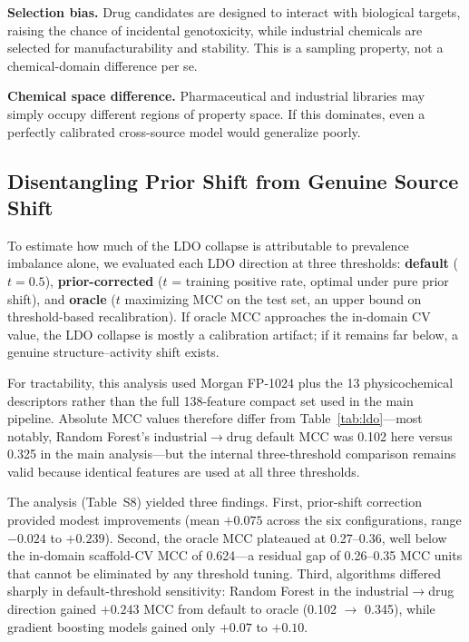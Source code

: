 \textbf{Selection bias.} Drug candidates are designed to interact with biological targets, raising the chance of incidental genotoxicity, while industrial chemicals are selected for manufacturability and stability. This is a sampling property, not a chemical-domain difference per se.

\textbf{Chemical space difference.} Pharmaceutical and industrial libraries may simply occupy different regions of property space.\cite{Lipinski_2004,Veber_2002} If this dominates, even a perfectly calibrated cross-source model would generalize poorly.

\subsection{Disentangling Prior Shift from Genuine Source Shift}

To estimate how much of the LDO collapse is attributable to prevalence imbalance alone, we evaluated each LDO direction at three thresholds: \textbf{default} ($t = 0.5$), \textbf{prior-corrected} ($t$ = training positive rate, optimal under pure prior shift), and \textbf{oracle} ($t$ maximizing MCC on the test set, an upper bound on threshold-based recalibration). If oracle MCC approaches the in-domain CV value, the LDO collapse is mostly a calibration artifact; if it remains far below, a genuine structure--activity shift exists.

For tractability, this analysis used Morgan FP-1024 plus the 13 physicochemical descriptors rather than the full 138-feature compact set used in the main pipeline. Absolute MCC values therefore differ from Table~\ref{tab:ldo}---most notably, Random Forest's industrial$\to$drug default MCC was 0.102 here versus 0.325 in the main analysis---but the internal three-threshold comparison remains valid because identical features are used at all three thresholds.

The analysis (Table~S8) yielded three findings. First, prior-shift correction provided modest improvements (mean $+0.075$ across the six configurations, range $-0.024$ to $+0.239$). Second, the oracle MCC plateaued at 0.27--0.36, well below the in-domain scaffold-CV MCC of 0.624---a residual gap of 0.26--0.35 MCC units that cannot be eliminated by any threshold tuning. Third, algorithms differed sharply in default-threshold sensitivity: Random Forest in the industrial$\to$drug direction gained $+0.243$ MCC from default to oracle (0.102 $\to$ 0.345), while gradient boosting models gained only $+0.07$ to $+0.10$.

